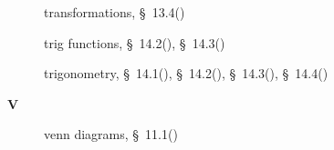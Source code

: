 \begin{multicols}{2}
{\begin{description}
	  \item[] \noindent\raggedright transformations,  \S~13.4(\pageref{m39358})
	  
	  \item[] \noindent\raggedright trig functions,  \S~14.2(\pageref{m39408}),  \S~14.3(\pageref{m39411})
	  
	  \item[] \noindent\raggedright trigonometry,  \S~14.1(\pageref{m39405}),  \S~14.2(\pageref{m39408}),  \S~14.3(\pageref{m39411}),  \S~14.4(\pageref{m39414})
	  \vspace{.3cm}
	  \item[{\large \bfseries V}]\noindent\raggedright
	  venn diagrams,  \S~11.1(\pageref{m39377})
    \end{description}
  }
      \end{multicols}
    \newpage \setlength{\parskip}{0pt}
    
